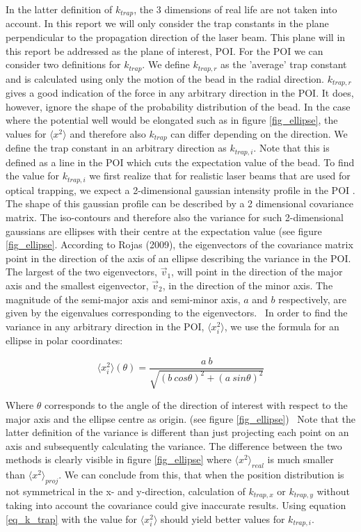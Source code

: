 In the latter definition of $k_{trap}$, the 3 dimensions of real life are not taken into account. In this report we will only consider the trap constants in the plane perpendicular to the propagation direction of the laser beam. This plane will in this report be addressed as the plane of interest, POI. For the POI we can consider two definitions for $k_{trap}$. We define $k_{trap,r}$ as the 'average' trap constant and is calculated using only the motion of the bead in the radial direction. $k_{trap,r}$ gives a good indication of the force in any arbitrary direction in the POI. It does, however, ignore the shape of the probability distribution of the bead. In the case where the potential well would be elongated such as in figure \ref{fig_ellipse}, the values for $ \langle x^2 \rangle $ and therefore also $k_{trap}$ can differ depending on the direction. We define the trap constant in an arbitrary direction as $k_{trap,i}$. Note that this is defined as a line in the POI which cuts the expectation value of the bead. To find the value for $k_{trap,i}$ we first realize that for realistic laser beams that are used for optical trapping, we expect a 2-dimensional gaussian intensity profile in the POI \cite{sheavitz}. The shape of this gaussian profile can be described by a 2 dimensional covariance matrix. The iso-contours and therefore also the variance for such 2-dimensional gaussians are ellipses with their centre at the expectation value \cite{chuong} (see figure \ref{fig_ellipse}. According to Rojas (2009), the eigenvectors of the covariance matrix point in the direction of the axis of an ellipse describing the variance in the POI. The largest of the two eigenvectors, $\vec{v}_1$, will point in the direction of the major axis and the smallest eigenvector, $\vec{v}_2$, in the direction of the minor axis. The magnitude of the semi-major axis and semi-minor axis, $a$ and $b$ respectively, are given by the eigenvalues corresponding to the eigenvectors.\cite{rojas} \
In order to find the variance in any arbitrary direction in the POI,  $ \langle x_i^2 \rangle$, we use the formula for an ellipse in polar coordinates:
\label{alternate_method}

\begin{equation}
	 \langle x_i^2 \rangle ( \theta ) = \frac{a \: b}{\sqrt{( b \: cos\theta)^2 + (a \: sin\theta )^2}}
\end{equation}

Where $\theta$ corresponds to the angle of the direction of interest with respect to the major axis and the ellipse centre as origin. (see figure \ref{fig_ellipse}) \
Note that the latter definition of the variance is different than just projecting each point on an axis and subsequently calculating the variance. The difference between the two methods is clearly visible in figure \ref{fig_ellipse} where $\langle x^2 \rangle _{real}$ is much smaller than $\langle x^2 \rangle _{proj}$. We can conclude from this, that when the position distribution is not symmetrical in the x- and y-direction, calculation of $k_{trap,x}$ or $k_{trap,y}$ without taking into account the covariance could give inaccurate results. Using equation \ref{eq_k_trap} with the value for $  \langle x_i^2 \rangle $ should yield better values for $k_{trap,i}$. 


